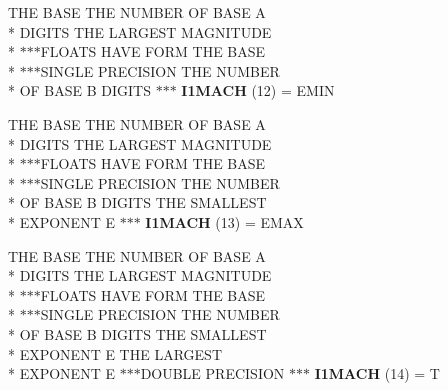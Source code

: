 \begin{DoxyCompactItemize}
\item 
\hypertarget{namespaceport_adf3916fe92deba8d2a9089772bf474a4}{T\+H\+E B\+A\+S\+E T\+H\+E N\+U\+M\+B\+E\+R O\+F B\+A\+S\+E A \\*
D\+I\+G\+I\+T\+S T\+H\+E L\+A\+R\+G\+E\+S\+T M\+A\+G\+N\+I\+T\+U\+D\+E \\*
$\ast$$\ast$$\ast$F\+L\+O\+A\+T\+S H\+A\+V\+E F\+O\+R\+M T\+H\+E B\+A\+S\+E \\*
$\ast$$\ast$$\ast$S\+I\+N\+G\+L\+E P\+R\+E\+C\+I\+S\+I\+O\+N T\+H\+E N\+U\+M\+B\+E\+R \\*
O\+F B\+A\+S\+E B D\+I\+G\+I\+T\+S $\ast$$\ast$$\ast$ {\bfseries I1\+M\+A\+C\+H} (12) = E\+M\+I\+N}\label{namespaceport_adf3916fe92deba8d2a9089772bf474a4}

\item 
\hypertarget{namespaceport_ae9598b8e511d9a04c87d13cbdb6906ca}{T\+H\+E B\+A\+S\+E T\+H\+E N\+U\+M\+B\+E\+R O\+F B\+A\+S\+E A \\*
D\+I\+G\+I\+T\+S T\+H\+E L\+A\+R\+G\+E\+S\+T M\+A\+G\+N\+I\+T\+U\+D\+E \\*
$\ast$$\ast$$\ast$F\+L\+O\+A\+T\+S H\+A\+V\+E F\+O\+R\+M T\+H\+E B\+A\+S\+E \\*
$\ast$$\ast$$\ast$S\+I\+N\+G\+L\+E P\+R\+E\+C\+I\+S\+I\+O\+N T\+H\+E N\+U\+M\+B\+E\+R \\*
O\+F B\+A\+S\+E B D\+I\+G\+I\+T\+S T\+H\+E S\+M\+A\+L\+L\+E\+S\+T \\*
E\+X\+P\+O\+N\+E\+N\+T E $\ast$$\ast$$\ast$ {\bfseries I1\+M\+A\+C\+H} (13) = E\+M\+A\+X}\label{namespaceport_ae9598b8e511d9a04c87d13cbdb6906ca}

\item 
\hypertarget{namespaceport_af73b2490b706ec422e85a89267378459}{T\+H\+E B\+A\+S\+E T\+H\+E N\+U\+M\+B\+E\+R O\+F B\+A\+S\+E A \\*
D\+I\+G\+I\+T\+S T\+H\+E L\+A\+R\+G\+E\+S\+T M\+A\+G\+N\+I\+T\+U\+D\+E \\*
$\ast$$\ast$$\ast$F\+L\+O\+A\+T\+S H\+A\+V\+E F\+O\+R\+M T\+H\+E B\+A\+S\+E \\*
$\ast$$\ast$$\ast$S\+I\+N\+G\+L\+E P\+R\+E\+C\+I\+S\+I\+O\+N T\+H\+E N\+U\+M\+B\+E\+R \\*
O\+F B\+A\+S\+E B D\+I\+G\+I\+T\+S T\+H\+E S\+M\+A\+L\+L\+E\+S\+T \\*
E\+X\+P\+O\+N\+E\+N\+T E T\+H\+E L\+A\+R\+G\+E\+S\+T \\*
E\+X\+P\+O\+N\+E\+N\+T E $\ast$$\ast$$\ast$D\+O\+U\+B\+L\+E P\+R\+E\+C\+I\+S\+I\+O\+N $\ast$$\ast$$\ast$ {\bfseries I1\+M\+A\+C\+H} (14) = T}\label{namespaceport_af73b2490b706ec422e85a89267378459}


\end{DoxyCompactItemize}
